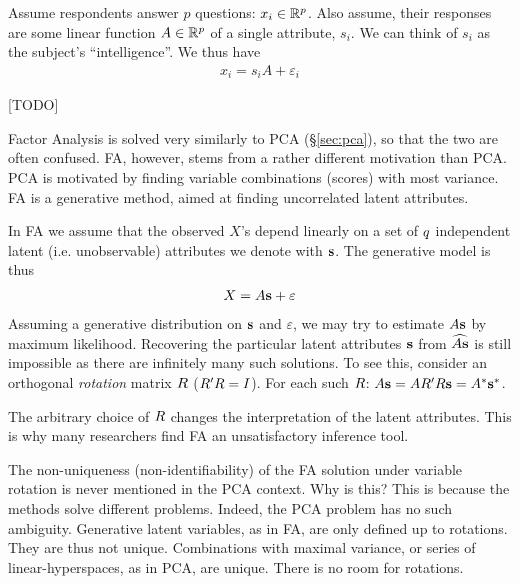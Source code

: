\begin{example}
\label{eg:intelligence}

Assume respondents answer $p$ questions: $x_i \in \mathbb{R}^p$. 
Also assume, their responses are some linear function $A \in \mathbb{R}^p$ of a single attribute, $s_i$. 
We can think of $s_i$ as the subject's ``intelligence''.
We thus have 
\begin{align}
	x_i = s_i A + \varepsilon_i
\end{align}
\end{example}



\begin{example}
\label{eg:face_rotations}
[TODO]
\end{example}




Factor Analysis is solved very similarly to PCA (\S\ref{sec:pca}), so that the two are often confused. 
FA, however, stems from a rather different motivation than PCA.
PCA is motivated by finding variable combinations (scores) with most variance. 
FA is a generative method, aimed at finding uncorrelated latent attributes. 

In FA we assume that the observed $X$'s depend linearly on a set of $q$ independent latent (i.e. unobservable) attributes we denote with $\mathbf{s}$.
The generative model is thus
\begin{align}
\label{eq:factor}
	X=A \mathbf{s}+\varepsilon
\end{align}
Assuming a generative distribution on $\mathbf{s}$ and $\varepsilon$, we may try to estimate $A \mathbf{s}$ by maximum likelihood.
Recovering the particular latent attributes $\mathbf{s}$ from $\widehat{A\mathbf{s}}$ is still impossible as there are infinitely many such solutions. To see this, consider an orthogonal \emph{rotation} matrix $R$ ($R' R=I$). For each such $R$: $ A \mathbf{s}=A R' R \mathbf{s} = A^* \mathbf{s}^*$.

The arbitrary choice of $R$ changes the interpretation of the latent attributes. This is why many researchers find FA an unsatisfactory inference tool.

\begin{remark}
	The non-uniqueness (non-identifiability) of the FA solution under variable rotation is never mentioned in the PCA context. Why is this?
	This is because the methods solve different problems. Indeed, the PCA problem has no such ambiguity. 
	Generative latent variables, as in FA, are only defined up to rotations. They are thus not unique. 
	Combinations with maximal variance, or series of linear-hyperspaces, as in PCA, are unique. There is no room for rotations.
\end{remark}



